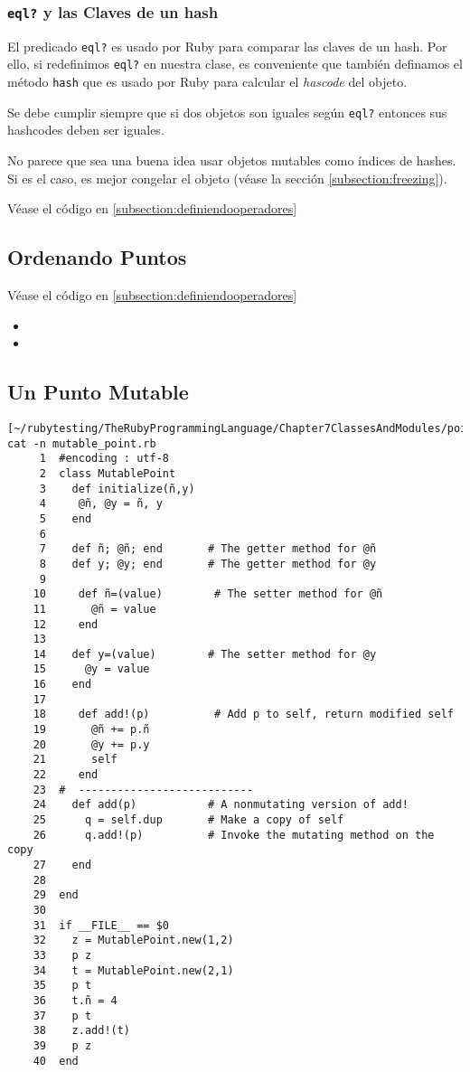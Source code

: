 \subsubsection{{\tt eql?} y las Claves de un hash}

El predicado \verb|eql?|
es usado por Ruby para comparar las claves de un hash.
Por ello, si redefinimos \verb|eql?| en nuestra clase,
es conveniente que también definamos el método
\verb|hash| que es usado por Ruby para calcular el {\it hascode}
del objeto. 

Se debe cumplir siempre 
que si dos objetos son iguales según \verb|eql?| entonces sus hashcodes
deben ser iguales.

No parece que sea una buena idea usar objetos mutables como índices de 
hashes. Si es el caso, es mejor congelar el objeto
(véase la sección \ref{subsection:freezing}).

Véase  el código en 
\ref{subsection:definiendooperadores}

\subsection{Ordenando Puntos}

Véase  el código en 
\ref{subsection:definiendooperadores}

\begin{itemize}
\item {}
\item {}
\end{itemize}

\subsection{Un Punto Mutable}

\begin{verbatim}
[~/rubytesting/TheRubyProgrammingLanguage/Chapter7ClassesAndModules/point]$ cat -n mutable_point.rb 
     1  #encoding : utf-8
     2  class MutablePoint
     3    def initialize(ñ,y)
     4     @ñ, @y = ñ, y 
     5    end
     6  
     7    def ñ; @ñ; end       # The getter method for @ñ
     8    def y; @y; end       # The getter method for @y
     9  
    10     def ñ=(value)        # The setter method for @ñ
    11       @ñ = value
    12     end
    13  
    14    def y=(value)        # The setter method for @y
    15      @y = value
    16    end
    17  
    18     def add!(p)          # Add p to self, return modified self
    19       @ñ += p.ñ
    20       @y += p.y
    21       self
    22     end
    23  #  ---------------------------
    24    def add(p)           # A nonmutating version of add!
    25      q = self.dup       # Make a copy of self
    26      q.add!(p)          # Invoke the mutating method on the copy
    27    end
    28  
    29  end
    30  
    31  if __FILE__ == $0
    32    z = MutablePoint.new(1,2)
    33    p z
    34    t = MutablePoint.new(2,1)
    35    p t 
    36    t.ñ = 4
    37    p t 
    38    z.add!(t)
    39    p z
    40  end
\end{verbatim}

